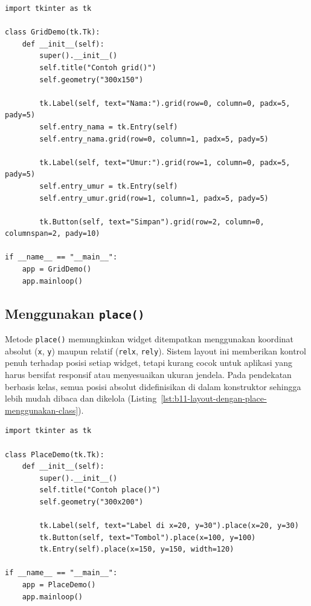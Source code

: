 \begin{lstlisting}[style=PythonStyle, caption={Contoh Layout dengan grid() Menggunakan Class}, label={lst:b11-layout-dengan-grid-menggunakan-class}]
import tkinter as tk

class GridDemo(tk.Tk):
    def __init__(self):
        super().__init__()
        self.title("Contoh grid()")
        self.geometry("300x150")

        tk.Label(self, text="Nama:").grid(row=0, column=0, padx=5, pady=5)
        self.entry_nama = tk.Entry(self)
        self.entry_nama.grid(row=0, column=1, padx=5, pady=5)

        tk.Label(self, text="Umur:").grid(row=1, column=0, padx=5, pady=5)
        self.entry_umur = tk.Entry(self)
        self.entry_umur.grid(row=1, column=1, padx=5, pady=5)

        tk.Button(self, text="Simpan").grid(row=2, column=0, columnspan=2, pady=10)

if __name__ == "__main__":
    app = GridDemo()
    app.mainloop()
\end{lstlisting}


\subsection{Menggunakan \texttt{place()}}

Metode \texttt{place()} memungkinkan widget ditempatkan menggunakan koordinat absolut (\texttt{x}, \texttt{y}) maupun relatif (\texttt{relx}, \texttt{rely}). Sistem layout ini memberikan kontrol penuh terhadap posisi setiap widget, tetapi kurang cocok untuk aplikasi yang harus bersifat responsif atau menyesuaikan ukuran jendela. Pada pendekatan berbasis kelas, semua posisi absolut didefinisikan di dalam konstruktor sehingga lebih mudah dibaca dan dikelola (Listing~\ref{lst:b11-layout-dengan-place-menggunakan-class}).

\begin{lstlisting}[style=PythonStyle, caption={Contoh Layout dengan place() Menggunakan Class}, label={lst:b11-layout-dengan-place-menggunakan-class}]
import tkinter as tk

class PlaceDemo(tk.Tk):
    def __init__(self):
        super().__init__()
        self.title("Contoh place()")
        self.geometry("300x200")

        tk.Label(self, text="Label di x=20, y=30").place(x=20, y=30)
        tk.Button(self, text="Tombol").place(x=100, y=100)
        tk.Entry(self).place(x=150, y=150, width=120)

if __name__ == "__main__":
    app = PlaceDemo()
    app.mainloop()
\end{lstlisting}

